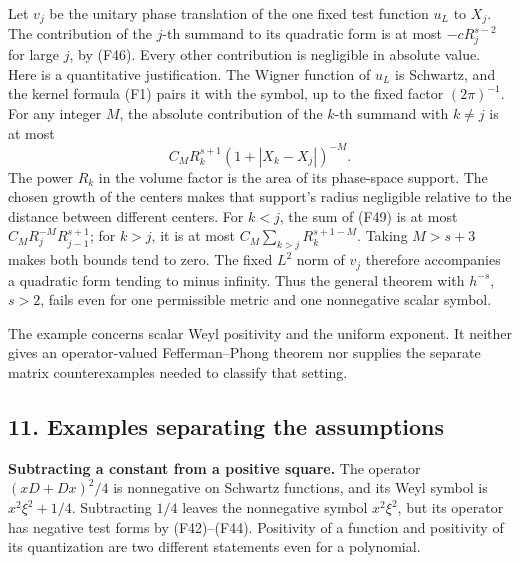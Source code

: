 \documentclass[
  11pt,
]{article}
\makeatletter
\let\ReaderOriginalAnchorStart\hyper@anchorstart
\let\ReaderOriginalAnchorEnd\hyper@anchorend
\let\ReaderPendingAliases\@empty
\def\ReaderArmAliases#1{\gdef\ReaderPendingAliases{#1}}
\def\hyper@anchorstart#1{\ReaderIfNativeAnchorTF{#1}{\ReaderPendingAliases\global\let\ReaderPendingAliases\@empty}{}\ReaderOriginalAnchorStart{#1}}
\makeatother
\begin{document}
Let \(v_j\) be the unitary phase translation of the one fixed test
function \(u_L\) to \(X_j\). The contribution of the \(j\)-th summand to
its quadratic form is at most \(-cR_j^{s-2}\) for large \(j\), by (F46).
Every other contribution is negligible in absolute value. Here is a
quantitative justification. The Wigner function of \(u_L\) is Schwartz,
and the kernel formula (F1) pairs it with the symbol, up to the fixed
factor \((2\pi)^{-1}\). For any integer \(M\), the absolute contribution
of the \(k\)-th summand with \(k\ne j\) is at most \[
C_M R_k^{s+1}(1+|X_k-X_j|)^{-M}.
\tag{F49}
\] The power \(R_k\) in the volume factor is the area of its phase-space
support. The chosen growth of the centers makes that support's radius
negligible relative to the distance between different centers. For
\(k<j\), the sum of (F49) is at most \(C_MR_j^{-M}R_{j-1}^{s+1}\); for
\(k>j\), it is at most \(C_M\sum_{k>j}R_k^{s+1-M}\). Taking \(M>s+3\)
makes both bounds tend to zero. The fixed \(L^2\) norm of \(v_j\)
therefore accompanies a quadratic form tending to minus infinity. Thus
the general theorem with \(h^{-s}\), \(s>2\), fails even for one
permissible metric and one nonnegative scalar symbol.

The example concerns scalar Weyl positivity and the uniform exponent. It
neither gives an operator-valued Fefferman--Phong theorem nor supplies
the separate matrix counterexamples needed to classify that setting.

\ReaderArmAliases{\ReaderOriginalAnchorStart{AN03-SFX-001}\ReaderOriginalAnchorEnd\begingroup\expandafter\def\csname @currentHref\endcsname{AN03-SFX-001}\label{AN03-SFX-001}\endgroup\ReaderOriginalAnchorStart{an03-sfx-001-examples-separating-the-assumptions}\ReaderOriginalAnchorEnd\begingroup\expandafter\def\csname @currentHref\endcsname{an03-sfx-001-examples-separating-the-assumptions}\label{an03-sfx-001-examples-separating-the-assumptions}\endgroup\ReaderOriginalAnchorStart{11-examples-separating-the-assumptions}\ReaderOriginalAnchorEnd\begingroup\expandafter\def\csname @currentHref\endcsname{11-examples-separating-the-assumptions}\label{11-examples-separating-the-assumptions}\endgroup\ReaderOriginalAnchorStart{examples-separating-the-assumptions}\ReaderOriginalAnchorEnd}
\subsection{11. Examples separating the
assumptions}\label{examples-separating-the-assumptions}

\textbf{Subtracting a constant from a positive square.} The operator
\((xD+D x)^2/4\) is nonnegative on Schwartz functions, and its Weyl
symbol is \(x^2\xi^2+1/4\). Subtracting \(1/4\) leaves the nonnegative
symbol \(x^2\xi^2\), but its operator has negative test forms by
(F42)--(F44). Positivity of a function and positivity of its
quantization are two different statements even for a polynomial.
\end{document}
